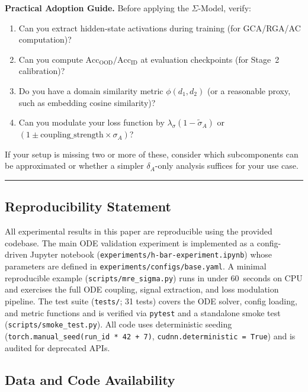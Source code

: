 \documentclass[10pt]{article}
\begin{document}
\medskip
\noindent\textbf{Practical Adoption Guide.}
Before applying the $\Sigma$-Model, verify:
\begin{enumerate}[nosep]
\item Can you extract hidden-state activations during training
  (for GCA/RGA/AC computation)?
\item Can you compute $\text{Acc}_{\text{OOD}} / \text{Acc}_{\text{ID}}$
  at evaluation checkpoints (for Stage~2 calibration)?
\item Do you have a domain similarity metric $\phi(d_1,d_2)$
  (or a reasonable proxy, such as embedding cosine similarity)?
\item Can you modulate your loss function by
  $\lambda_\sigma(1 - \tilde{\sigma}_A)$ or
  $(1 \pm \text{coupling\_strength} \times \sigma_A)$?
\end{enumerate}
If your setup is missing two or more of these, consider which
subcomponents can be approximated or whether a simpler
$\delta_A$-only analysis suffices for your use case.

\noindent\rule{\linewidth}{0.4pt}

\subsection*{Reproducibility Statement}

All experimental results in this paper are reproducible using the provided codebase. The main ODE validation experiment is implemented as a config-driven Jupyter notebook (\texttt{experiments/h-bar-experiment.ipynb}) whose parameters are defined in \texttt{experiments/configs/base.yaml}. A minimal reproducible example (\texttt{scripts/mre\_sigma.py}) runs in under 60~seconds on CPU and exercises the full ODE coupling, signal extraction, and loss modulation pipeline. The test suite (\texttt{tests/}; 31 tests) covers the ODE solver, config loading, and metric functions and is verified via \texttt{pytest} and a standalone smoke test (\texttt{scripts/smoke\_test.py}). All code uses deterministic seeding (\texttt{torch.manual\_seed(run\_id * 42 + 7)}, \texttt{cudnn.deterministic = True}) and is audited for deprecated APIs.

\subsection*{Data and Code Availability}
\end{document}
